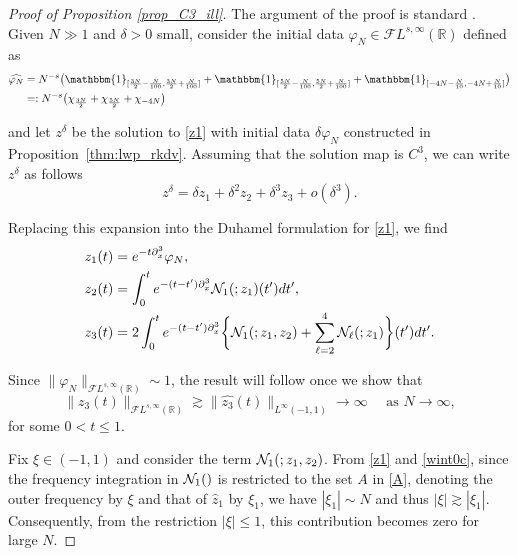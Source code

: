 \documentclass[a4paper,
11pt,  reqno]{amsart}
\makeatletter
\newcommand{\5}{\textup{V}}
\newcommand{\noi}{\noindent}
\newcommand{\FL}{\mathcal{F} L}
\newcommand{\ft}{\widehat}
\newcommand{\F}{\mathcal{F}}
\newcommand{\dx}{\partial_x}
\theoremstyle{remark}
\newcommand{\R}{\mathbb{R}}
\renewcommand{\l}{\ell}
\newcommand{\ges}{\gtrsim}
\def\<#1>{\csname MH@symb@#1\endcsname}
\numberwithin{equation}{section}
\numberwithin{theorem}{section}
\newcommand{\Ncal}{\mathcal{N}}
\makeatother
\begin{document}
\begin{proof}[Proof of Proposition \ref{prop_C3_ill}]
The argument of the proof is standard \cite{taobejenaru, bou_ill_kdv, MolTzeSaut_ill, Tzvetkov_ill}.
    Given $N\gg 1$ and $\delta>0$ small, consider the initial data $\varphi_N\in \mathcal{F}L^{s,\infty}(\R)$ defined as
\begin{align}
        \widehat{\varphi_N}&=N^{-s}\big(\mathbbm{1}_{[\frac{3N}{2}-\frac{N}{100}, \frac{3N}{2}+\frac{N}{100}]} + \mathbbm{1}_{[\frac{5N}{2}-\frac{N}{100}, \frac{5N}{2}+\frac{N}{100}]} + \mathbbm{1}_{[-4N-\frac{N}{10}, -4N+\frac{N}{10}]}\big)\\
        &=: N^{-s} \big(\chi_{\frac{3N}2}+ \chi_{\frac{5N}2} + \chi_{-4N} \big)
\end{align}


\noi
    and let $z^\delta$ be the solution to \eqref{z1} with initial data $\delta \varphi_N $ constructed in Proposition~\ref{thm:lwp_rkdv}. Assuming that the solution map is $C^3$, we can write $z^\delta$ as follows
    $$
    z^\delta = \delta z_1 + \delta^2z_2 + \delta^3 z_3 + o(\delta^3).
    $$

    \noi 
    Replacing this expansion into the Duhamel formulation for \eqref{z1}, we find 
    {
    \begin{align}
         z_1(t) &= e^{-t\dx^3} \varphi_N 
        , 
        \\
         z_2 (t) &= \int_0^t e^{-(t-t')\dx^3}\Ncal_1(\<1>;  z_1) (t') dt'
        , 
        \\
         z_3 (t) 
         &= 2 \int_0^t e^{-(t-t')\dx^3} 
         \bigg\{ \Ncal_1(\<1>;  {z}_1, z_2) 
         + \sum_{\l=2}^4\Ncal_\l(\<21>; z_1) 
         \bigg\}(t') dt'
        .
        \label{eq:z3}
    \end{align}
}


    
    \noi
    Since $\|\varphi_N\|_{\F L^{s,\infty}(\R)}\sim 1$,
    the result will follow once we show that 
   $$
    \|z_3(t)\|_{\FL^{s,\infty}(\R)} \gtrsim \| \ft{z_3}(t)\|_{ L^{\infty}(-1,1)}\to \infty \quad \mbox{ as }N\to \infty
    ,
    $$
for some {$0< t \le 1$}. 

Fix $\xi\in(-1,1)$ and consider the term $\Ncal_1(\<1>; {z}_1, z_2)$.
From \eqref{z1} and \eqref{wint0c}, since the frequency integration in $\Ncal_1(\<1>)$ is restricted to the set $A$ in \eqref{A}, denoting the outer frequency by $\xi$ and that of $\ft{z}_1$ by $\xi_1$, we have $|\xi_1| \sim N $ and thus $|\xi| \ges |\xi_1|$. Consequently, from the restriction $|\xi| \le 1$, this contribution becomes zero for large $N$.



\end{proof}
\end{document}
